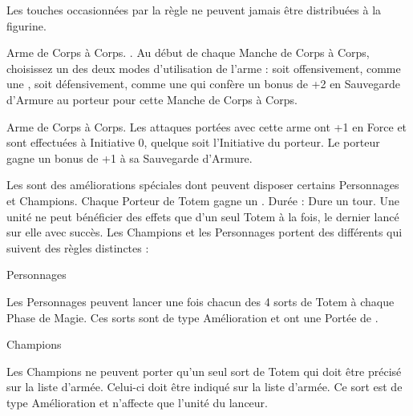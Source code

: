 \armyspecialruleentry{\halfhorse}

Les touches occasionnées par la règle \stomp{} ne peuvent jamais être distribuées à la figurine.

\closearmyspecialrules




\newpage
\startarmyarmoury

\startitemlistonecol

\listitemonecol{\soothsayerstaff}Arme de Corps à Corps. \requirestwohands{}. Au début de chaque Manche de Corps à Corps, choisissez un des deux modes d'utilisation de l'arme : soit offensivement, comme une \gw{}, soit défensivement, comme une \hw{} qui confère un bonus de +2 en Sauvegarde d'Armure au porteur pour cette Manche de Corps à Corps.

\listitemonecol{\beastaxe}Arme de Corps à Corps. Les attaques portées avec cette arme ont +1 en Force et sont effectuées à Initiative 0, quelque soit l'Initiative du porteur. Le porteur gagne un bonus de +1 à sa Sauvegarde d'Armure.

\enditemlistonecol

\closearmyarmoury






\spaceaftersection{}

Les \totems{} sont des améliorations spéciales dont peuvent disposer certains Personnages et Champions. Chaque Porteur de Totem gagne un . Durée : Dure un tour. Une unité ne peut bénéficier des effets que d'un seul Totem à la fois, le dernier lancé sur elle avec succès. Les Champions et les Personnages portent des \totems{} différents qui suivent des règles distinctes :

\begin{multicols}{2}
\raggedcolumns

	\begin{center}{\Largerfontsize\antiquefont Personnages}\end{center}
	\vspace{5pt}
	Les Personnages peuvent lancer une fois chacun des 4 sorts de Totem à chaque Phase de Magie. Ces sorts sont de type Amélioration et ont une Portée de .

	\vspace*{\fill}
	\columnbreak
	
	\begin{center}{\Largerfontsize\antiquefont Champions}\end{center}
	\vspace{5pt}
	Les Champions ne peuvent porter qu'un seul sort de Totem qui doit être précisé sur la liste d'armée. Celui-ci doit être indiqué sur la liste d'armée. Ce sort est de type Amélioration et n'affecte que l'unité du lanceur.

	\vspace*{\fill}
\end{multicols}

